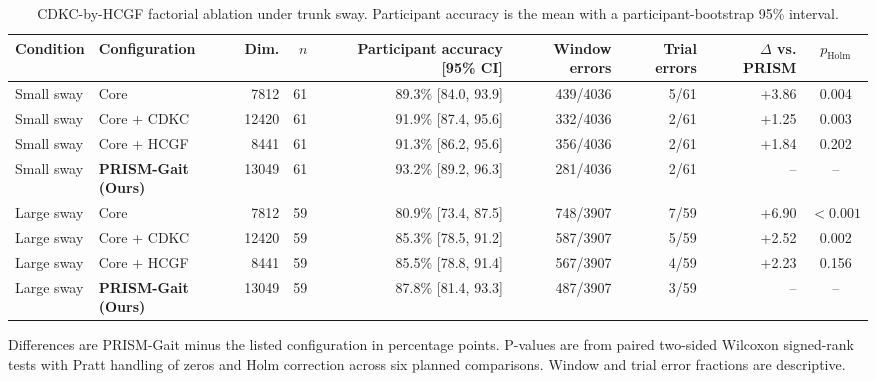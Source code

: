 \begin{table}[t]
\caption{CDKC-by-HCGF factorial ablation under trunk sway. Participant accuracy is the mean with a participant-bootstrap 95\% interval.}
\label{tab:ablation_statistics}
\centering
\small
\setlength{\tabcolsep}{3.5pt}
\renewcommand{\arraystretch}{1.16}
\begin{adjustbox}{max width=\textwidth}
\begin{tabular}{llrrrrrrc}
\toprule
Condition & Configuration & Dim. & $n$ & Participant accuracy [95\% CI] & Window errors & Trial errors & $\Delta$ vs. PRISM & $p_{\mathrm{Holm}}$ \\
\midrule
Small sway & Core & 7812 & 61 & 89.3\% [84.0, 93.9] & 439/4036 & 5/61 & +3.86 & 0.004 \\
Small sway & Core + CDKC & 12420 & 61 & 91.9\% [87.4, 95.6] & 332/4036 & 2/61 & +1.25 & 0.003 \\
Small sway & Core + HCGF & 8441 & 61 & 91.3\% [86.2, 95.6] & 356/4036 & 2/61 & +1.84 & 0.202 \\
Small sway & \textbf{PRISM-Gait (Ours)} & 13049 & 61 & 93.2\% [89.2, 96.3] & 281/4036 & 2/61 & -- & -- \\
\addlinespace[2pt]
Large sway & Core & 7812 & 59 & 80.9\% [73.4, 87.5] & 748/3907 & 7/59 & +6.90 & $<0.001$ \\
Large sway & Core + CDKC & 12420 & 59 & 85.3\% [78.5, 91.2] & 587/3907 & 5/59 & +2.52 & 0.002 \\
Large sway & Core + HCGF & 8441 & 59 & 85.5\% [78.8, 91.4] & 567/3907 & 4/59 & +2.23 & 0.156 \\
Large sway & \textbf{PRISM-Gait (Ours)} & 13049 & 59 & 87.8\% [81.4, 93.3] & 487/3907 & 3/59 & -- & -- \\
\bottomrule
\end{tabular}
\end{adjustbox}
\vspace{2pt}
\parbox{0.98\textwidth}{\footnotesize Differences are PRISM-Gait minus the listed configuration in percentage points. P-values are from paired two-sided Wilcoxon signed-rank tests with Pratt handling of zeros and Holm correction across six planned comparisons. Window and trial error fractions are descriptive.}
\end{table}
